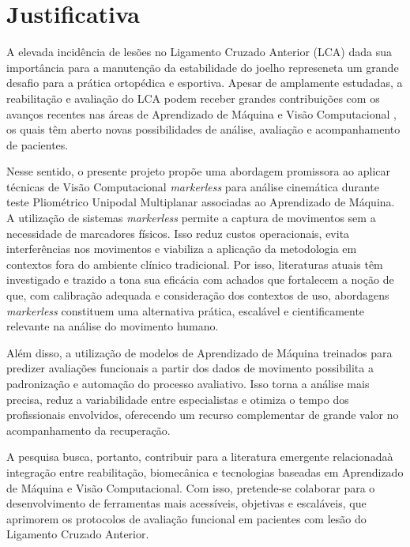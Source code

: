 \documentclass{article}
\begin{document}
\section{Justificativa}

\noindent A elevada incidência de lesões no Ligamento Cruzado Anterior (LCA) \cite{Evans2025, Petushek2019} dada sua importância para a manutenção da estabilidade do joelho \cite{Evans2025} represeneta um grande desafio para a prática ortopédica e esportiva.  Apesar de amplamente estudadas, a reabilitação e avaliação do LCA podem receber grandes contribuições com os avanços recentes nas áreas de Aprendizado de Máquina e Visão Computacional \cite{Andriollo2024}, os quais têm aberto novas possibilidades de análise, avaliação e acompanhamento de pacientes.

Nesse sentido, o presente projeto propõe uma abordagem promissora ao aplicar técnicas de Visão Computacional \textit{markerless} para análise cinemática durante teste Pliométrico Unipodal Multiplanar associadas ao Aprendizado de Máquina. A utilização de sistemas \textit{markerless} permite a captura de movimentos sem a necessidade de marcadores físicos. Isso reduz custos operacionais, evita interferências nos movimentos e viabiliza a aplicação da metodologia em contextos fora do ambiente clínico tradicional. Por isso, literaturas atuais têm investigado e trazido a tona sua eficácia \cite{Dill2023, VanHooren2023, Fukushima2024} com achados que fortalecem a noção de que, com calibração adequada e consideração dos contextos de uso, abordagens \textit{markerless} constituem uma alternativa prática, escalável e cientificamente relevante na análise do movimento humano. 

Além disso, a utilização de modelos de Aprendizado de Máquina treinados para predizer avaliações funcionais a partir dos dados de movimento possibilita a padronização e automação do processo avaliativo. Isso torna a análise mais precisa, reduz a variabilidade entre especialistas e otimiza o tempo dos profissionais envolvidos, oferecendo um recurso complementar de grande valor no acompanhamento da recuperação.

A pesquisa busca, portanto, contribuir para a literatura emergente relacionadaà integração entre reabilitação, biomecânica e tecnologias baseadas em Aprendizado de Máquina e Visão Computacional. Com isso, pretende-se colaborar para o desenvolvimento de ferramentas mais acessíveis, objetivas e escaláveis, que aprimorem os protocolos de avaliação funcional em pacientes com lesão do Ligamento Cruzado Anterior. 
\end{document}
